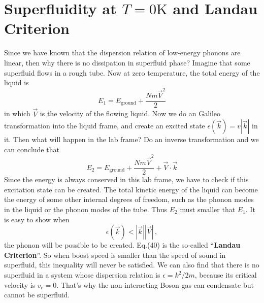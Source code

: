 \documentclass{article}
\begin{document}
\section{Superfluidity at $T=0\mathrm{K}$ and Landau Criterion}
Since we have known that the dispersion relation of low-energy phonons are linear, then why there is no dissipation in superfluid phase? Imagine that some superfluid flows in a rough tube. Now at zero temperature, the total energy of the liquid is
\begin{equation}
E_1=E_{\textrm{ground}}+\frac{Nm\vec{V}^2}{2}
\end{equation}
in which $\vec{V}$ is the velocity of the flowing liquid. Now we do an Galileo transformation into the liquid frame, and create an excited state $\epsilon(\vec{k})=v|\vec{k}|$ in it. Then what will happen in the lab frame? Do an inverse transformation and we can conclude that
\begin{equation}
E_2=E_{\textrm{ground}}+\frac{Nm\vec{V}^2}{2}+\vec{V}\cdot\vec{k}
\end{equation}
Since the energy is always conserved in this lab frame, we have to check if this excitation state can be created. The total kinetic energy of the liquid can become the energy of some other internal degrees of freedom, such as the phonon modes in the liquid or the phonon modes of the tube. Thus $E_2$ must smaller that $E_1$. It is easy to show when
\begin{equation}
\epsilon(\vec{k})<|\vec{k}||\vec{V}|\,,
\end{equation}
the phonon will be possible to be created. Eq.(40) is the so-called ``{\bf{Landau Criterion}}''. So when boost speed is smaller than the speed of sound in superfluid, this inequality will never be satisfied. We can also find that there is no superfluid in a system whose dispersion relation is $\epsilon = k^2/2m$, because its critical velocity is $v_c=0$. That's why the non-interacting Boson gas can condensate but cannot be superfluid.
\end{document}

